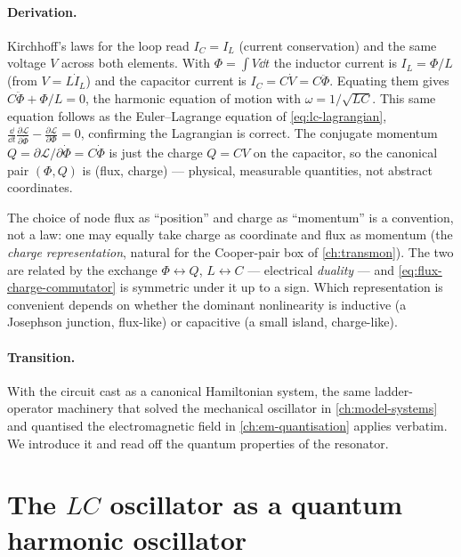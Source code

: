 \paragraph{Derivation.}
Kirchhoff's laws for the loop read $I_C=I_L$ (current conservation)
and the same voltage $V$ across both elements. With $\Phi=\int V\dd t$
the inductor current is $I_L=\Phi/L$ (from $V=L\dot I_L$) and the
capacitor current is $I_C=C\dot V=C\ddot\Phi$. Equating them gives
$C\ddot\Phi+\Phi/L=0$, the harmonic equation of motion with
$\omega=1/\sqrt{LC}$. This same equation follows as the
Euler--Lagrange equation of \cref{eq:lc-lagrangian},
$\frac{\dd}{\dd t}\frac{\partial\mathcal L}{\partial\dot\Phi}
-\frac{\partial\mathcal L}{\partial\Phi}=0$, confirming the
Lagrangian is correct. The conjugate momentum
$Q=\partial\mathcal L/\partial\dot\Phi=C\dot\Phi$ is just the charge
$Q=CV$ on the capacitor, so the canonical pair $(\Phi,Q)$ is
(flux, charge) --- physical, measurable quantities, not abstract
coordinates.

\begin{remark}
The choice of node flux as ``position'' and charge as ``momentum'' is
a convention, not a law: one may equally take charge as coordinate
and flux as momentum (the \emph{charge representation}, natural for
the Cooper-pair box of \cref{ch:transmon}). The two are related by
the exchange $\Phi\leftrightarrow Q$, $L\leftrightarrow C$ ---
electrical \emph{duality} --- and \cref{eq:flux-charge-commutator} is
symmetric under it up to a sign. Which representation is convenient
depends on whether the dominant nonlinearity is inductive (a
Josephson junction, flux-like) or capacitive (a small island,
charge-like).
\end{remark}

\paragraph{Transition.}
With the circuit cast as a canonical Hamiltonian system, the same
ladder-operator machinery that solved the mechanical oscillator in
\cref{ch:model-systems} and quantised the electromagnetic field in
\cref{ch:em-quantisation} applies verbatim. We introduce it and read
off the quantum properties of the resonator.

\section{The \texorpdfstring{$LC$}{LC} oscillator as a quantum harmonic oscillator}
\label{sec:lc-oscillator}

